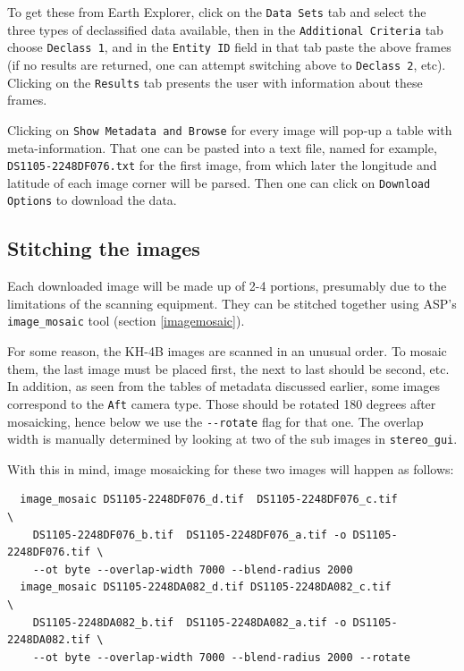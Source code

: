 To get these from Earth Explorer, click on the \texttt{Data Sets}
tab and select the three types of declassified data available, then in the 
\texttt{Additional Criteria} tab choose \texttt{Declass 1}, and in
the \texttt{Entity ID} field in that tab paste the above frames (if no results
are returned, one can attempt switching above to \texttt{Declass 2},
etc). Clicking on the \texttt{Results} tab presents the user with information about
these frames.

Clicking on \texttt{Show Metadata and Browse} for every
image will pop-up a table with meta-information. That one can be pasted
into a text file, named for example, \texttt{DS1105-2248DF076.txt} for the
first image, from which later the longitude and latitude of each image corner
will be parsed. Then one can click on \texttt{Download Options} 
to download the data. 

\subsection{Stitching the images}

Each downloaded image will be made up of 2-4 portions, presumably due
to the limitations of the scanning equipment. They can be stitched together
using ASP's \texttt{image\_mosaic} tool (section \ref{imagemosaic}).

For some reason, the KH-4B images are scanned in an unusual order. To
mosaic them, the last image must be placed first, the next to last
should be second, etc. In addition, as seen from the tables of metadata discussed
earlier, some images correspond to the \texttt{Aft} camera type. Those
should be rotated 180 degrees after mosaicking, hence below we use
the \texttt{-\/-rotate} flag for that one.  The overlap width is manually 
determined by looking at two of the sub images in \texttt{stereo\_gui}.

With this in mind, image mosaicking for these two images will happen as follows:

\begin{verbatim}
  image_mosaic DS1105-2248DF076_d.tif  DS1105-2248DF076_c.tif              \
    DS1105-2248DF076_b.tif  DS1105-2248DF076_a.tif -o DS1105-2248DF076.tif \
    --ot byte --overlap-width 7000 --blend-radius 2000
  image_mosaic DS1105-2248DA082_d.tif DS1105-2248DA082_c.tif               \
    DS1105-2248DA082_b.tif  DS1105-2248DA082_a.tif -o DS1105-2248DA082.tif \
    --ot byte --overlap-width 7000 --blend-radius 2000 --rotate
\end{verbatim}

